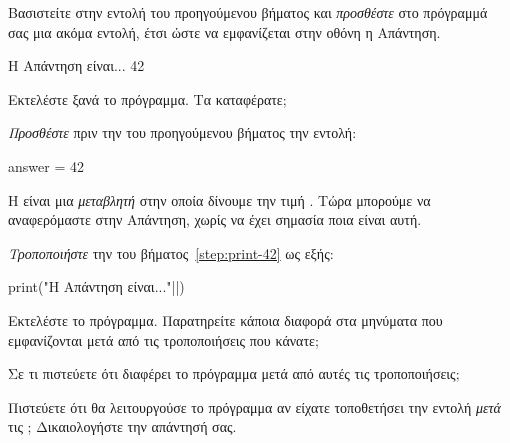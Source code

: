 \documentclass[a4paper,11pt,oneside]{book}
\begin{document}
\begin{step}
\label{step:print-42}
Βασιστείτε στην εντολή του προηγούμενου βήματος και \emph{προσθέστε} στο πρόγραμμά σας μια ακόμα εντολή, έτσι ώστε να εμφανίζεται στην οθόνη η Απάντηση.

\marginnote[16pt]{\iconcomputer}
\begin{pyterm}
Η Απάντηση είναι... 42
\end{pyterm}

Εκτελέστε ξανά το πρόγραμμα. Τα καταφέρατε;

\marginnote[14pt]{\icondiscuss}
\dottedline

\end{step}

\clearpage
\begin{step}
\label{step:answer-assign}


\emph{Προσθέστε} πριν την  του προηγούμενου βήματος την εντολή:

\begin{pynew}
answer = 42
\end{pynew}

Η  είναι μια \emph{μεταβλητή} στην οποία δίνουμε την τιμή . Tώρα μπορούμε να αναφερόμαστε στην Απάντηση, χωρίς να έχει σημασία ποια είναι αυτή.

\emph{Τροποποιήστε} την  του βήματος~\ref{step:print-42} ως εξής:

\begin{pyplain}
print("Η Απάντηση είναι..."||)
\end{pyplain}

Εκτελέστε το πρόγραμμα. Παρατηρείτε κάποια διαφορά στα μηνύματα που εμφανίζονται μετά από τις τροποποιήσεις που κάνατε;

\marginnote[14pt]{\icondiscuss}
\dottedline

Σε τι πιστεύετε ότι διαφέρει το πρόγραμμα μετά από αυτές τις τροποποιήσεις;

\marginnote[14pt]{\icondiscuss}
\dottedline

\dottedline

Πιστεύετε ότι θα λειτουργούσε το πρόγραμμα αν είχατε τοποθετήσει την εντολή  \emph{μετά} τις ; Δικαιολογήστε την απάντησή σας.

\marginnote[14pt]{\icondiscuss}
\dottedline

\dottedline

\end{step}
\end{document}
